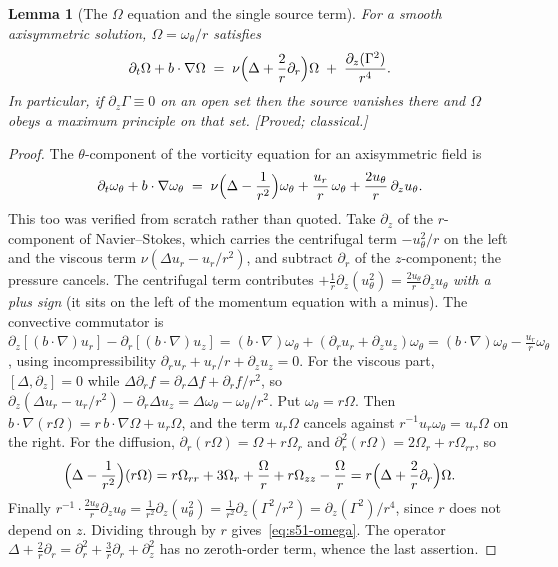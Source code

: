 \documentclass[11pt]{article}
\newtheorem{lemma}[theorem]{Lemma}
\theoremstyle{definition}
\theoremstyle{remark}
\begin{document}
\begin{lemma}[The $\Omega$ equation and the single source term]
  \label{lem:s51-omega}
  For a smooth axisymmetric solution, $\Omega=\omega_\theta/r$ satisfies
  \begin{equation}\label{eq:s51-omega}
    \partial_t\Omega + b\cdot\nabla\Omega
    \;=\; \nu\Bigl(\Delta + \frac{2}{r}\partial_r\Bigr)\Omega
      \;+\; \frac{\partial_z(\Gamma^2)}{r^4}.
  \end{equation}
  In particular, if $\partial_z\Gamma\equiv0$ on an open set then the source
  vanishes there and $\Omega$ obeys a maximum principle on that set.
  \emph{[Proved; classical.]}
\end{lemma}
\begin{proof}
  The $\theta$-component of the vorticity equation for an axisymmetric field
  is
  \begin{equation}\label{eq:s51-omtheta}
    \partial_t\omega_\theta + b\cdot\nabla\omega_\theta
    \;=\; \nu\Bigl(\Delta-\frac{1}{r^2}\Bigr)\omega_\theta
      + \frac{u_r}{r}\,\omega_\theta
      + \frac{2u_\theta}{r}\,\partial_zu_\theta .
  \end{equation}
  This too was verified from scratch rather than quoted. Take $\partial_z$ of
  the $r$-component of Navier--Stokes, which carries the centrifugal term
  $-u_\theta^2/r$ on the left and the viscous term
  $\nu(\Delta u_r-u_r/r^2)$, and subtract $\partial_r$ of the $z$-component;
  the pressure cancels. The centrifugal term contributes
  $+\tfrac1r\partial_z(u_\theta^2)=\tfrac{2u_\theta}{r}\partial_zu_\theta$
  \emph{with a plus sign} (it sits on the left of the momentum equation with a
  minus). The convective commutator is
  $\partial_z[(b\cdot\nabla)u_r]-\partial_r[(b\cdot\nabla)u_z]
   =(b\cdot\nabla)\omega_\theta+(\partial_ru_r+\partial_zu_z)\omega_\theta
   =(b\cdot\nabla)\omega_\theta-\tfrac{u_r}{r}\omega_\theta$, using
  incompressibility $\partial_ru_r+u_r/r+\partial_zu_z=0$. For the viscous
  part, $[\Delta,\partial_z]=0$ while
  $\Delta\partial_rf=\partial_r\Delta f+\partial_rf/r^2$, so
  $\partial_z(\Delta u_r-u_r/r^2)-\partial_r\Delta u_z
   =\Delta\omega_\theta-\omega_\theta/r^2$.
  Put $\omega_\theta=r\Omega$. Then
  $b\cdot\nabla(r\Omega)=r\,b\cdot\nabla\Omega+u_r\Omega$, and the term
  $u_r\Omega$ cancels against $r^{-1}u_r\omega_\theta=u_r\Omega$ on the right.
  For the diffusion, $\partial_r(r\Omega)=\Omega+r\Omega_r$ and
  $\partial_r^2(r\Omega)=2\Omega_r+r\Omega_{rr}$, so
  \[
    \Bigl(\Delta-\frac1{r^2}\Bigr)(r\Omega)
    = r\Omega_{rr}+3\Omega_r+\frac{\Omega}{r}+r\Omega_{zz}-\frac{\Omega}{r}
    = r\Bigl(\Delta+\frac2r\partial_r\Bigr)\Omega .
  \]
  Finally $r^{-1}\cdot\tfrac{2u_\theta}{r}\partial_zu_\theta
  =\tfrac{1}{r^2}\partial_z(u_\theta^2)
  =\tfrac{1}{r^2}\partial_z(\Gamma^2/r^2)
  =\partial_z(\Gamma^2)/r^4$, since $r$ does not depend on $z$. Dividing
  through by $r$ gives~\eqref{eq:s51-omega}. The operator
  $\Delta+\tfrac2r\partial_r=\partial_r^2+\tfrac3r\partial_r+\partial_z^2$ has
  no zeroth-order term, whence the last assertion.
\end{proof}
\end{document}

